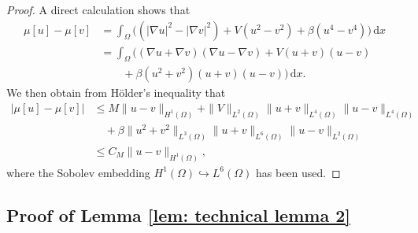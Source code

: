 \documentclass{siamart250211}
\def\d{\,\mathrm{d}}
\begin{document}
\begin{proof}
	A direct calculation shows that 
	\begin{align*}
		\mu[u] - \mu[v] & = \int_{\Omega} \Big(  (|\nabla u|^2 - |\nabla v|^2) + V(u^2 - v^2) + \beta (u^4 - v^4) \Big) \d x \\
		& = \int_{\Omega} \Big(  (\nabla u + \nabla v)(\nabla u - \nabla v) + V (u+v)(u-v) \\
		& \quad\quad + \beta (u^2 + v^2)(u+v)(u-v) \Big) \d x.
	\end{align*}
	We then obtain from H\"older's inequality that 
	\begin{align*}
		|\mu[u] - \mu[v]| & \le M \|u-v\|_{H^1(\Omega)} + \|V\|_{L^{2}(\Omega)}\|u+v\|_{L^4(\Omega)}\|u-v\|_{L^4(\Omega)} \\
		& \quad + \beta \|u^2 + v^2\|_{L^3(\Omega)}\|u+v\|_{L^6(\Omega)}\|u-v\|_{L^2(\Omega)} \\
		& \le C_M \|u-v\|_{H^1(\Omega)},
	\end{align*} 
	where the Sobolev embedding $H^1(\Omega) \hookrightarrow L^6(\Omega)$ has been used.
\end{proof}

\subsection{Proof of Lemma \ref{lem: technical lemma 2}}
\end{document}
